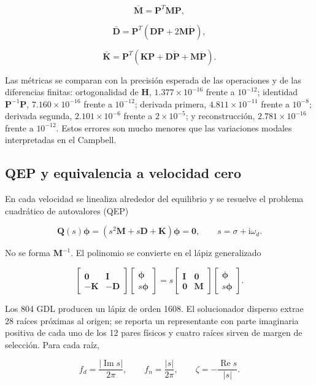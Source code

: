 \documentclass[oneside,a4paper,spanish,links]{amca}
\begin{document}
\[
\bar{\bm M}=\bm P^T\bm M\bm P,
\]

\[
\bar{\bm D}=\bm P^T
(\bm D\bm P+2\bm M\dot{\bm P}),
\]

\[
\bar{\bm K}=\bm P^T
(\bm K\bm P+\bm D\dot{\bm P}+\bm M\ddot{\bm P}).
\]

Las métricas se comparan con la precisión esperada de las operaciones y de las diferencias finitas: ortogonalidad de $\bm H$, $1.377\times10^{-16}$ frente a $10^{-12}$; identidad $\bm P^{-1}\bm P$, $7.160\times10^{-16}$ frente a $10^{-12}$; derivada primera, $4.811\times10^{-11}$ frente a $10^{-8}$; derivada segunda, $2.101\times10^{-6}$ frente a $2\times10^{-5}$; y reconstrucción, $2.781\times10^{-16}$ frente a $10^{-12}$. Estos errores son mucho menores que las variaciones modales interpretadas en el Campbell.

\subsection{QEP y equivalencia a velocidad cero}

En cada velocidad se linealiza alrededor del equilibrio y se resuelve el problema cuadrático de autovalores (QEP)

\[
\bm Q(s)\bm\phi
=\left(s^2\bm M+s\bm D+\bm K\right)\bm\phi=\bm0,
\qquad s=\sigma+\mathrm i\omega_d .
\]

No se forma $\bm M^{-1}$. El polinomio se convierte en el lápiz generalizado

\[
\begin{bmatrix}
\bm0&\bm I\\
-\bm K&-\bm D
\end{bmatrix}
\begin{bmatrix}\bm\phi\\s\bm\phi\end{bmatrix}
=s
\begin{bmatrix}
\bm I&\bm0\\
\bm0&\bm M
\end{bmatrix}
\begin{bmatrix}\bm\phi\\s\bm\phi\end{bmatrix}.
\]

Los 804 GDL producen un lápiz de orden 1608. El solucionador disperso extrae 28 raíces próximas al origen; se reporta un representante con parte imaginaria positiva de cada uno de los 12 pares físicos y cuatro raíces sirven de margen de selección. Para cada raíz,

\[
f_d=\frac{|\operatorname{Im}s|}{2\pi},
\qquad
f_n=\frac{|s|}{2\pi},
\qquad
\zeta=-\frac{\operatorname{Re}s}{|s|}.
\]
\end{document}
